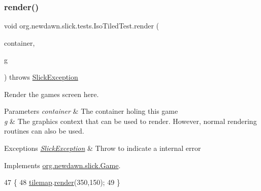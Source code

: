 \subsubsection{\texorpdfstring{render()}{render()}}
{\footnotesize\ttfamily void org.\+newdawn.\+slick.\+tests.\+Iso\+Tiled\+Test.\+render (\begin{DoxyParamCaption}\item[{\mbox{\hyperlink{classorg_1_1newdawn_1_1slick_1_1_game_container}{Game\+Container}}}]{container,  }\item[{\mbox{\hyperlink{classorg_1_1newdawn_1_1slick_1_1_graphics}{Graphics}}}]{g }\end{DoxyParamCaption}) throws \mbox{\hyperlink{classorg_1_1newdawn_1_1slick_1_1_slick_exception}{Slick\+Exception}}\hspace{0.3cm}{\ttfamily [inline]}}

Render the game\textquotesingle{}s screen here.


\begin{DoxyParams}{Parameters}
{\em container} & The container holing this game \\
\hline
{\em g} & The graphics context that can be used to render. However, normal rendering routines can also be used. \\
\hline
\end{DoxyParams}

\begin{DoxyExceptions}{Exceptions}
{\em \mbox{\hyperlink{classorg_1_1newdawn_1_1slick_1_1_slick_exception}{Slick\+Exception}}} & Throw to indicate a internal error \\
\hline
\end{DoxyExceptions}


Implements \mbox{\hyperlink{interfaceorg_1_1newdawn_1_1slick_1_1_game_af1a4670d43eb3ba04dfcf55ab1975b64}{org.\+newdawn.\+slick.\+Game}}.


\begin{DoxyCode}
47                                   \{
48         \mbox{\hyperlink{classorg_1_1newdawn_1_1slick_1_1tests_1_1_iso_tiled_test_a50c678a4d5ae115e8b9c76363c127aab}{tilemap}}.\mbox{\hyperlink{classorg_1_1newdawn_1_1slick_1_1tiled_1_1_tiled_map_a313dd901616b31c772f213675d236389}{render}}(350,150);
49     \}
\end{DoxyCode}
\mbox{\label{classorg_1_1newdawn_1_1slick_1_1tests_1_1_iso_tiled_test_ac5123464946332b31ff9ff2cbb06e24c}} 
